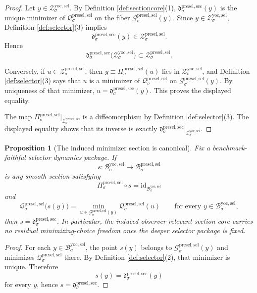 \documentclass[11pt]{article}
\newcommand{\YoctoSelectorBody}[1]{\mathcal B_{#1}^{\mathrm{yoc,sel}}}
\newcommand{\YoctoSelectorShell}[1]{\mathcal Z_{#1}^{\mathrm{yoc,sel}}}
\newcommand{\PreSelectorMinSection}[1]{\mathfrak d_{#1}^{\mathrm{presel,sec}}}
\newcommand{\PreSectionSelectorBody}[1]{\mathcal B_{#1}^{\mathrm{presel,sel}}}
\newcommand{\PreSectionSelectorProj}[1]{\Pi_{#1}^{\mathrm{presel,sel}}}
\newcommand{\PreSectionSelectorFiber}[2]{\mathcal G_{#1}^{\mathrm{presel,sel}}(#2)}
\newcommand{\PreSectionSelectorFunctional}[1]{\mathscr Q_{#1}^{\mathrm{presel,sel}}}
\newcommand{\PreSectionSelectorShell}[1]{\mathcal Z_{#1}^{\mathrm{presel,sel}}}
\newtheorem{proposition}{Proposition}
\begin{document}
\begin{proof}
Let \(y\in\YoctoSelectorShell{\sigma}\). By Definition \ref{def:sectioncore}(1), \(\PreSelectorMinSection{\sigma}(y)\) is the unique minimizer of \(\PreSectionSelectorFunctional{\sigma}\) on the fiber \(\PreSectionSelectorFiber{\sigma}{y}\). Since \(y\in\YoctoSelectorShell{\sigma}\), Definition \ref{def:selector}(3) implies
\[
\PreSelectorMinSection{\sigma}(y)\in\PreSectionSelectorShell{\sigma}.
\]
Hence
\[
\PreSelectorMinSection{\sigma}\bigl(\YoctoSelectorShell{\sigma}\bigr)\subset\PreSectionSelectorShell{\sigma}.
\]

Conversely, if \(u\in\PreSectionSelectorShell{\sigma}\), then \(y\equiv\PreSectionSelectorProj{\sigma}(u)\) lies in \(\YoctoSelectorShell{\sigma}\), and Definition \ref{def:selector}(3) says that \(u\) is a minimizer of \(\PreSectionSelectorFunctional{\sigma}\) on \(\PreSectionSelectorFiber{\sigma}{y}\). By uniqueness of that minimizer, \(u=\PreSelectorMinSection{\sigma}(y)\). This proves the displayed equality.

The map \(\PreSectionSelectorProj{\sigma}\big|_{\PreSectionSelectorShell{\sigma}}\) is a diffeomorphism by Definition \ref{def:selector}(3). The displayed equality shows that its inverse is exactly \(\PreSelectorMinSection{\sigma}\big|_{\YoctoSelectorShell{\sigma}}\).
\end{proof}

\begin{proposition}[The induced minimizer section is canonical]
\label{prop:canonical}
Fix a benchmark-faithful selector dynamics package. If
\[
s:\YoctoSelectorBody{\sigma}\to\PreSectionSelectorBody{\sigma}
\]
is any smooth section satisfying
\[
\PreSectionSelectorProj{\sigma}\circ s
=
\mathrm{id}_{\YoctoSelectorBody{\sigma}}
\]
and
\[
\PreSectionSelectorFunctional{\sigma}\bigl(s(y)\bigr)
=
\min_{u\in\PreSectionSelectorFiber{\sigma}{y}}
\PreSectionSelectorFunctional{\sigma}(u)
\qquad
\text{for every }
y\in\YoctoSelectorBody{\sigma},
\]
then \(s=\PreSelectorMinSection{\sigma}\). In particular, the induced observer-relevant section core carries no residual minimizing-choice freedom once the deeper selector package is fixed.
\end{proposition}

\begin{proof}
For each \(y\in\YoctoSelectorBody{\sigma}\), the point \(s(y)\) belongs to \(\PreSectionSelectorFiber{\sigma}{y}\) and minimizes \(\PreSectionSelectorFunctional{\sigma}\) there. By Definition \ref{def:selector}(2), that minimizer is unique. Therefore
\[
s(y)=\PreSelectorMinSection{\sigma}(y)
\]
for every \(y\), hence \(s=\PreSelectorMinSection{\sigma}\).
\end{proof}
\end{document}
